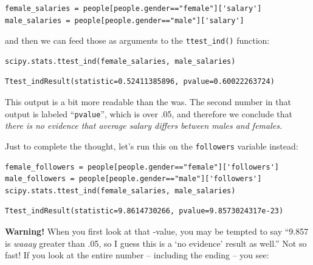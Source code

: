 \begin{Verbatim}[fontsize=\footnotesize,samepage=true,frame=single,framesep=3mm]
female_salaries = people[people.gender=="female"]['salary']
male_salaries = people[people.gender=="male"]['salary']
\end{Verbatim}
\vspace{-.2in}



and then we can feed those as arguments to the \texttt{ttest\_ind()} function:

\begin{Verbatim}[fontsize=\small,samepage=true,frame=single,framesep=3mm]
scipy.stats.ttest_ind(female_salaries, male_salaries)
\end{Verbatim}
\vspace{-.2in}

\begin{Verbatim}[fontsize=\footnotesize,samepage=true,frame=leftline,framesep=5mm,framerule=1mm]
Ttest_indResult(statistic=0.52411385896, pvalue=0.60022263724)
\end{Verbatim}

This output is a bit more readable than the  was. The second number in
that output is labeled ``\texttt{pvalue}'', which is over .05, and therefore we
conclude that \textit{there is no evidence that average salary differs between
males and females.}

Just to complete the thought, let's run this on the \texttt{followers} variable
instead:

\begin{Verbatim}[fontsize=\footnotesize,samepage=true,frame=single,framesep=3mm]
female_followers = people[people.gender=="female"]['followers']
male_followers = people[people.gender=="male"]['followers']
scipy.stats.ttest_ind(female_salaries, male_salaries)
\end{Verbatim}
\vspace{-.2in}

\begin{Verbatim}[fontsize=\footnotesize,samepage=true,frame=leftline,framesep=5mm,framerule=1mm]
Ttest_indResult(statistic=9.8614730266, pvalue=9.8573024317e-23)
\end{Verbatim}

\textbf{Warning!} When you first look at that -value, you may be tempted to
say ``9.857 is \textit{waaay} greater than .05, so I guess this is a `no
evidence' result as well.'' Not so fast! If you look at the entire number --
including the ending -- you see:

